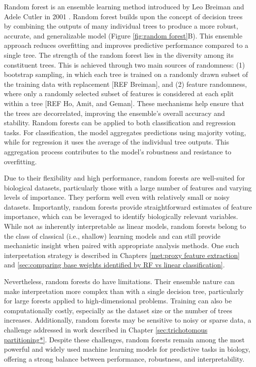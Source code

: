 \documentclass{report}
\begin{document}
Random forest is an ensemble learning method introduced by Leo Breiman and Adele Cutler in 2001 
\cite{breiman_random_2001}. Random forest builds upon the concept of decision trees by combining the outputs of many individual trees to produce a more robust, accurate, and generalizable model (Figure \ref{fig:random forest}B). This ensemble approach reduces overfitting and improves predictive performance compared to a single tree. The strength of the random forest lies in the diversity among its constituent trees. This is achieved through two main sources of randomness: (1) bootstrap sampling, in which each tree is trained on a randomly drawn subset of the training data with replacement [REF Breiman], and (2) feature randomness, where only a randomly selected subset of features is considered at each split within a tree [REF Ho, Amit, and Geman]. These mechanisms help ensure that the trees are decorrelated, improving the ensemble’s overall accuracy and stability. Random forests can be applied to both classification and regression tasks. For classification, the model aggregates predictions using majority voting, while for regression it uses the average of the individual tree outputs. This aggregation process contributes to the model’s robustness and resistance to overfitting.

Due to their flexibility and high performance, random forests are well-suited for biological datasets, particularly those with a large number of features and varying levels of importance. They perform well even with relatively small or noisy datasets. Importantly, random forests provide straightforward estimates of feature importance, which can be leveraged to identify biologically relevant variables. While not as inherently interpretable as linear models, random forests belong to the class of classical (i.e., shallow) learning models and can still provide mechanistic insight when paired with appropriate analysis methods. One such interpretation strategy is described in Chapters \ref{met:proxy feature extraction} and \ref{sec:comparing base weights identified by RF vs linear classification}.

Nevertheless, random forests do have limitations. Their ensemble nature can make interpretation more complex than with a single decision tree, particularly for large forests applied to high-dimensional problems. Training can also be computationally costly, especially as the dataset size or the number of trees increases. Additionally, random forests may be sensitive to noisy or sparse data, a challenge addressed in work described in Chapter \ref{sec:trichotomous partitioning*}. Despite these challenges, random forests remain among the most powerful and widely used machine learning models for predictive tasks in biology, offering a strong balance between performance, robustness, and interpretability.
\end{document}
